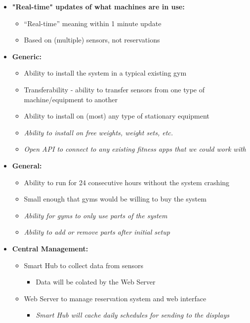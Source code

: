 \documentclass[letterpaper,11pt]{texMemo} %
\begin{document}
\begin{itemize}
    \item{\textbf{"Real-time" updates of what machines are in use:}}
    \begin{itemize}
        \item{“Real-time” meaning within 1 minute update}
        \item{Based on (multiple) sensors, not reservations}
    \end{itemize}

    \item{\textbf{Generic:}}
    \begin{itemize}
        \item{Ability to install the system in a typical existing gym}
        \item{Transferability - ability to transfer sensors from one type of machine/equipment to another}
        \item{Ability to install on (most) any type of stationary equipment}
        \item{\textit{Ability to install on free weights, weight sets, etc.}}
        \item{\textit{Open API to connect to any existing fitness apps that we could work with}}
    \end{itemize}

    \item{\textbf{General:}}
    \begin{itemize}
        \item{Ability to run for 24 consecutive hours without the system crashing}
        \item{Small enough that gyms would be willing to buy the system}
        \item{\textit{Ability for gyms to only use parts of the system}}
        \item{\textit{Ability to add or remove parts after initial setup}}
    \end{itemize}

    \item{\textbf{Central Management:}}
    \begin{itemize}
        \item{Smart Hub to collect data from sensors}
        \begin{itemize}
            \item{Data will be colated by the Web Server}
        \end{itemize}
        \item{Web Server to manage reservation system and web interface}
        \begin{itemize}
            \item{\textit{Smart Hub will cache daily schedules for sending to the displays}}
        \end{itemize}
    \end{itemize}


\end{itemize}
\end{document}
